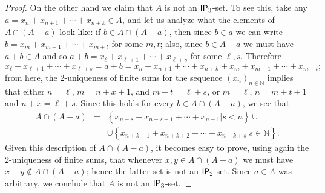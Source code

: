 \documentclass{jloganal}
\theoremstyle{definition}
\newcommand{\ip}{\mathnormal{\mathsf{IP}}}
\begin{document}
\begin{proof}
    On the other hand we claim that $A$ is not an $\ip_3$-set. To see this, take any $a=x_n+x_{n+1}+\cdots+x_{n+k}\in A$, and let us analyze what the elements of $A\cap(A-a)$ look like: if $b\in A\cap(A-a)$, then since $b\in a$ we can write $b=x_m+x_{m+1}+\cdots+x_{m+t}$ for some $m,t$; also, since $b\in A-a$ we must have $a+b\in A$ and so $a+b=x_\ell+x_{\ell+1}+\cdots+x_{\ell+s}$ for some $\ell,s$. Therefore
    \begin{equation*}        x_\ell+x_{\ell+1}+\cdots+x_{\ell+s}=a+b=x_n+x_{n+1}+\cdots+x_{n+k}+x_m+x_{m+1}+\cdots+x_{m+t};
    \end{equation*}
    from here, the $2$-uniqueness of finite sums for the sequence $(x_n)_{n\in\mathbb N}$ implies that either $n=\ell$, $m=n+x+1$, and $m+t=\ell+s$, or $m=\ell$, $n=m+t+1$ and $n+x=\ell+s$. Since this holds for every $b\in A\cap(A-a)$, we see that
    \begin{eqnarray*}
        A\cap(A-a) & = & \left\{x_{n-s}+x_{n-s+1}+\cdots+x_{n-1}\big|s<n\right\}\cup \\
        & & \cup\left\{x_{n+k+1}+x_{n+k+2}+\cdots+x_{n+k+s}\big|s\in\mathbb N\right\}.
    \end{eqnarray*}
    Given this description of $A\cap(A-a)$, it becomes easy to prove, using again the $2$-uniqueness of finite sums, that whenever $x,y\in A\cap(A-a)$ we must have $x+y\notin A\cap(A-a)$; hence the latter set is not an $\ip_2$-set. Since $a\in A$ was arbitrary, we conclude that $A$ is not an $\ip_3$-set.
\end{proof}
\end{document}

